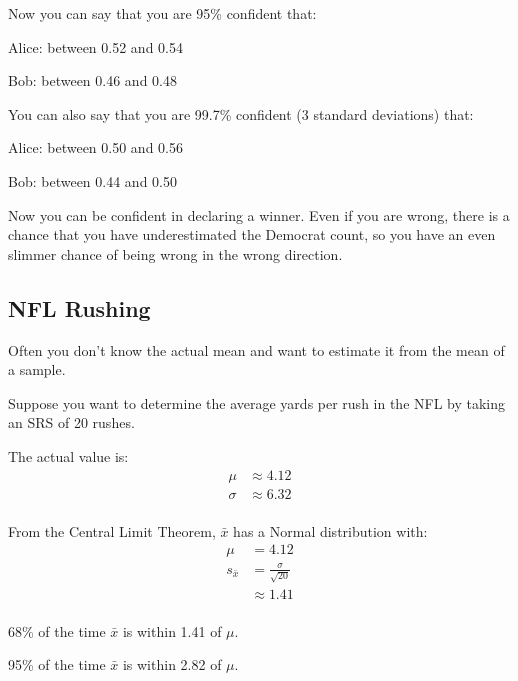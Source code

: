 \documentclass[letterpaper, landscape]{exam}
\begin{document}
  Now you can say that you are 95\% confident that:
  \begin{itemize*}
    \item Alice: between 0.52 and 0.54
    \item Bob: between 0.46 and 0.48
  \end{itemize*}

  You can also say that you are 99.7\% confident (3 standard deviations) that:
  \begin{itemize*}
    \item Alice: between 0.50 and 0.56
    \item Bob: between 0.44 and 0.50
  \end{itemize*}

  Now you can be confident in declaring a winner. Even if you are wrong, there
  is a chance that you have underestimated the Democrat count, so you have an
  even slimmer chance of being wrong in the wrong direction.

  \subsection{NFL Rushing}
  Often you don't know the actual mean and want to estimate it from the mean of
  a sample.

  Suppose you want to determine the average yards per rush in the NFL by taking
  an SRS of 20 rushes.

  The actual value is:
  \begin{align*}
    \mu    & \approx 4.12 \\
    \sigma & \approx 6.32 \\
  \end{align*}

  From the Central Limit Theorem, $\bar{x}$ has a Normal distribution with:
  \begin{align*}
    \mu         & = 4.12 \\
    s_{\bar{x}} & = \frac{\sigma}{\sqrt{20}} \\
                & \approx 1.41 \\
  \end{align*}

  \begin{itemize*}
    \item 68\% of the time $\bar{x}$ is within 1.41 of $\mu$.
    \item 95\% of the time $\bar{x}$ is within 2.82 of $\mu$.
  \end{itemize*}
\end{document}
